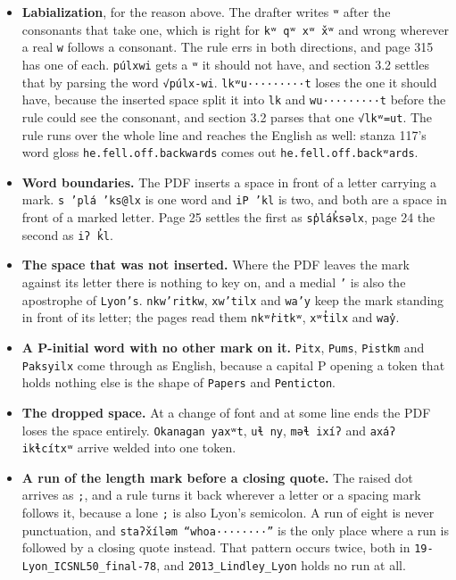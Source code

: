 \begin{itemize}
\item \textbf{Labialization}, for the reason above. The drafter writes \texttt{ʷ} after the consonants that take one, which is right for \texttt{kʷ qʷ xʷ x̌ʷ} and wrong wherever a real \texttt{w} follows a consonant. The rule errs in both directions, and page 315 has one of each. \texttt{púlxwi} gets a \texttt{ʷ} it should not have, and section 3.2 settles that by parsing the word \texttt{√púlx-\allowbreak{}wi}. \texttt{lkʷu·········t} loses the one it should have, because the inserted space split it into \texttt{lk} and \texttt{wu·········t} before the rule could see the consonant, and section 3.2 parses that one \texttt{√lkʷ=ut}. The rule runs over the whole line and reaches the English as well: stanza 117's word gloss \texttt{he.\allowbreak{}fell.\allowbreak{}off.\allowbreak{}backwards} comes out \texttt{he.\allowbreak{}fell.\allowbreak{}off.\allowbreak{}backʷards}.
\item \textbf{Word boundaries.} The PDF inserts a space in front of a letter carrying a mark. \texttt{s ’plá ’ks@lx} is one word and \texttt{i\allowbreak{}P ’kl} is two, and both are a space in front of a marked letter. Page 25 settles the first as \texttt{sp̓lák̓səlx}, page 24 the second as \texttt{iʔ k̓l}.
\item \textbf{The space that was not inserted.} Where the PDF leaves the mark against its letter there is nothing to key on, and a medial \texttt{’} is also the apostrophe of \texttt{Lyon’s}. \texttt{nkw’ritkw}, \texttt{xw’tilx} and \texttt{wa’y} keep the mark standing in front of its letter; the pages read them \texttt{nkʷr̓itkʷ}, \texttt{xʷt̓ilx} and \texttt{way̓}.
\item \textbf{A P-initial word with no other mark on it.} \texttt{Pitx}, \texttt{Pums}, \texttt{Pistkm} and \texttt{Paksyilx} come through as English, because a capital P opening a token that holds nothing else is the shape of \texttt{Papers} and \texttt{Penticton}.
\item \textbf{The dropped space.} At a change of font and at some line ends the PDF loses the space entirely. \texttt{Okanagan yaxʷt}, \texttt{uɬ ny}, \texttt{məɬ ixíʔ} and \texttt{axáʔ ikɬcítxʷ} arrive welded into one token.
\item \textbf{A run of the length mark before a closing quote.} The raised dot arrives as \texttt{;}, and a rule turns it back wherever a letter or a spacing mark follows it, because a lone \texttt{;} is also Lyon's semicolon. A run of eight is never punctuation, and \texttt{staʔx̌íləm “whoa········”} is the only place where a run is followed by a closing quote instead. That pattern occurs twice, both in \texttt{19-\allowbreak{}Lyon\_\allowbreak{}ICSNL50\_\allowbreak{}final-\allowbreak{}78}, and \texttt{2013\_\allowbreak{}Lindley\_\allowbreak{}Lyon} holds no run at all.

\end{itemize}
